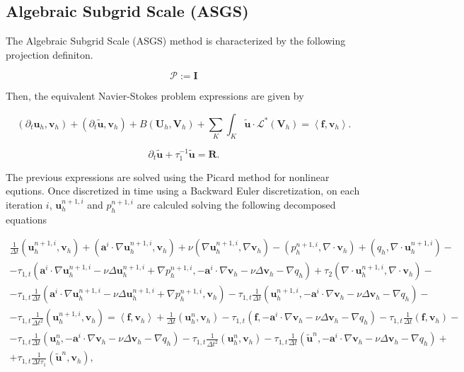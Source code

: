 \subsection*{Algebraic Subgrid Scale (ASGS)}
The Algebraic Subgrid Scale (ASGS) method is characterized by the following projection definiton.

\begin{equation}
\label{4}
\mathcal{P}:=\mathbf{I}
\end{equation}

Then, the equivalent Navier-Stokes problem expressions are given by

\begin{equation}
\label{5}
(\partial_t\mathbf{u}_h,\mathbf{v}_h)+(\partial_t\tilde{\mathbf{u}},\mathbf{v}_h)+B(\mathbf{U}_h,\mathbf{V}_h)+\sum_K\int_K\tilde{\mathbf{u}}\cdot\mathcal{L}^*(\mathbf{V}_h)=\left<\mathbf{f},\mathbf{v}_h\right>.
\end{equation}

\begin{equation}
\label{6}
\partial_t\tilde{\mathbf{u}}+\tau_1^{-1}\tilde{\mathbf{u}}=\mathbf{R}.
\end{equation}

The previous expressions are solved using the Picard method for nonlinear equtions. Once discretized in time using a Backward Euler discretization, on each iteration $ i $, $ \mathbf{u}_h^{n+1,i} $ and $ p_h^{n+1,i} $ are calculed solving the following decomposed equations

\begin{eqnarray}
\label{7}
\frac{1}{\Delta t}(\mathbf{u}_h^{n+1,i},\mathbf{v}_h)+(\mathbf{a}^i\cdot\nabla\mathbf{u}_h^{n+1,i},\mathbf{v}_h)+\nu(\nabla\mathbf{u}_h^{n+1,i},\nabla\mathbf{v}_h)-(p_h^{n+1,i},\nabla\cdot\mathbf{v}_h)+(q_h,\nabla\cdot\mathbf{u}_h^{n+1,i})-\\\nonumber
-\tau_{1,t}(\mathbf{a}^i\cdot\nabla\mathbf{u}_h^{n+1,i}-\nu\Delta\mathbf{u}_h^{n+1,i}+\nabla p_h^{n+1,i},-\mathbf{a}^i\cdot\nabla\mathbf{v}_h-\nu\Delta\mathbf{v}_h-\nabla q_h)+\tau_2(\nabla\cdot\mathbf{u}_h^{n+1,i},\nabla\cdot\mathbf{v}_h)-\\\nonumber
-\tau_{1,t}\frac{1}{\Delta t}(\mathbf{a}^i\cdot\nabla\mathbf{u}_h^{n+1,i}-\nu\Delta\mathbf{u}_h^{n+1,i}+\nabla p_h^{n+1,i},\mathbf{v}_h)-\tau_{1,t}\frac{1}{\Delta t}(\mathbf{u}_h^{n+1,i},-\mathbf{a}^i\cdot\nabla\mathbf{v}_h-\nu\Delta\mathbf{v}_h-\nabla q_h)-\\\nonumber
-\tau_{1,t}\frac{1}{\Delta t^2}(\mathbf{u}_h^{n+1,i},\mathbf{v}_h)=\left<\mathbf{f},\mathbf{v}_h\right>+\frac{1}{\Delta t}(\mathbf{u}_h^n,\mathbf{v}_h)-\tau_{1,t}(\mathbf{f},-\mathbf{a}^i\cdot\nabla\mathbf{v}_h-\nu\Delta\mathbf{v}_h-\nabla q_h)-\tau_{1,t}\frac{1}{\Delta t}(\mathbf{f},\mathbf{v}_h)-\\\nonumber
-\tau_{1,t}\frac{1}{\Delta t}(\mathbf{u}_h^n,-\mathbf{a}^i\cdot\nabla\mathbf{v}_h-\nu\Delta\mathbf{v}_h-\nabla q_h)-\tau_{1,t}\frac{1}{\Delta t^2}(\mathbf{u}_h^n,\mathbf{v}_h)-\tau_{1,t}\frac{1}{\Delta t}(\tilde{\mathbf{u}}^n,-\mathbf{a}^i\cdot\nabla\mathbf{v}_h-\nu\Delta\mathbf{v}_h-\nabla q_h)+\\\nonumber
+\tau_{1,t}\frac{1}{\Delta t\tau_1}(\tilde{\mathbf{u}}^n,\mathbf{v}_h),
\end{eqnarray}

